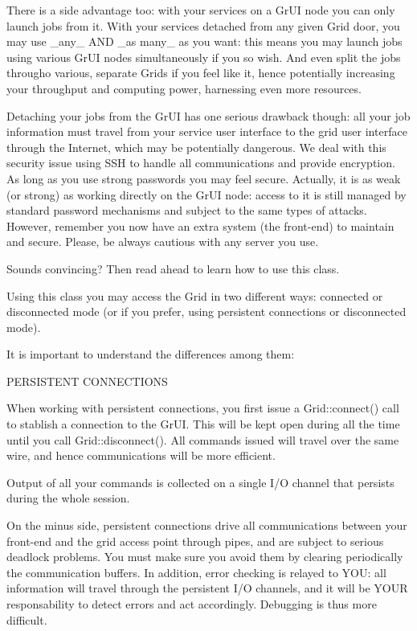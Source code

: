 There is a side advantage too: with your services on a Gr\-UI node you can only launch jobs from it. With your services detached from any given Grid door, you may use \_\-any\_\- AND \_\-as many\_\- as you want: this means you may launch jobs using various Gr\-UI nodes simultaneously if you so wish. And even split the jobs througho various, separate Grids if you feel like it, hence potentially increasing your throughput and computing power, harnessing even more resources.

Detaching your jobs from the Gr\-UI has one serious drawback though: all your job information must travel from your service user interface to the grid user interface through the Internet, which may be potentially dangerous. We deal with this security issue using SSH to handle all communications and provide encryption. As long as you use strong passwords you may feel secure. Actually, it is as weak (or strong) as working directly on the Gr\-UI node: access to it is still managed by standard password mechanisms and subject to the same types of attacks. However, remember you now have an extra system (the front-end) to maintain and secure. Please, be always cautious with any server you use.

Sounds convincing? Then read ahead to learn how to use this class.

Using this class you may access the Grid in two different ways: connected or disconnected mode (or if you prefer, using persistent connections or disconnected mode).

It is important to understand the differences among them:

PERSISTENT CONNECTIONS

When working with persistent connections, you first issue a Grid::connect() call to stablish a connection to the Gr\-UI. This will be kept open during all the time until you call Grid::disconnect(). All commands issued will travel over the same wire, and hence communications will be more efficient.

Output of all your commands is collected on a single I/O channel that persists during the whole session.

On the minus side, persistent connections drive all communications between your front-end and the grid access point through pipes, and are subject to serious deadlock problems. You must make sure you avoid them by clearing periodically the communication buffers. In addition, error checking is relayed to YOU: all information will travel through the persistent I/O channels, and it will be YOUR responsability to detect errors and act accordingly. Debugging is thus more difficult.

